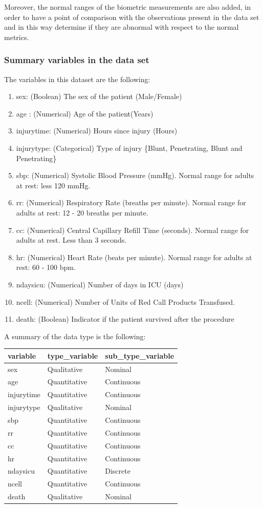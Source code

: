 \documentclass[
]{article}
\begin{document}
Moreover, the normal ranges of the biometric measurements are also
added, in order to have a point of comparison with the observations
present in the data set and in this way determine if they are abnormal
with respect to the normal metrics.

\newpage

\hypertarget{summary-variables-in-the-data-set}{%
\subsubsection{Summary variables in the data
set}\label{summary-variables-in-the-data-set}}

The variables in this dataset are the following:

\begin{enumerate}
\def\labelenumi{\arabic{enumi}.}
\item
  sex: (Boolean) The sex of the patient (Male/Female)
\item
  age : (Numerical) Age of the patient(Years)
\item
  injurytime: (Numerical) Hours since injury (Hours)
\item
  injurytype: (Categorical) Type of injury \{Blunt, Penetrating, Blunt
  and Penetrating\}
\item
  sbp: (Numerical) Systolic Blood Pressure (mmHg). Normal range for
  adults at rest: less 120 mmHg.
\item
  rr: (Numerical) Respiratory Rate (breaths per minute). Normal range
  for adults at rest: 12 - 20 breaths per minute.
\item
  cc: (Numerical) Central Capillary Refill Time (seconds). Normal range
  for adults at rest. Less than 3 seconds.
\item
  hr: (Numerical) Heart Rate (beats per minute). Normal range for adults
  at rest: 60 - 100 bpm.
\item
  ndaysicu: (Numerical) Number of days in ICU (days)
\item
  ncell: (Numerical) Number of Units of Red Call Products Transfused.
\item
  death: (Boolean) Indicator if the patient survived after the procedure
\end{enumerate}

A summary of the data type is the following:

\begin{longtable}[]{@{}lll@{}}
\toprule
variable & type\_variable & sub\_type\_variable\tabularnewline
\midrule
\endhead
sex & Qualitative & Nominal\tabularnewline
age & Quantitative & Continuous\tabularnewline
injurytime & Quantitative & Continuous\tabularnewline
injurytype & Qualitative & Nominal\tabularnewline
sbp & Quantitative & Continuous\tabularnewline
rr & Quantitative & Continuous\tabularnewline
cc & Quantitative & Continuous\tabularnewline
hr & Quantitative & Continuous\tabularnewline
ndaysicu & Quantitative & Discrete\tabularnewline
ncell & Quantitative & Continuous\tabularnewline
death & Qualitative & Nominal\tabularnewline
\bottomrule
\end{longtable}
\end{document}
